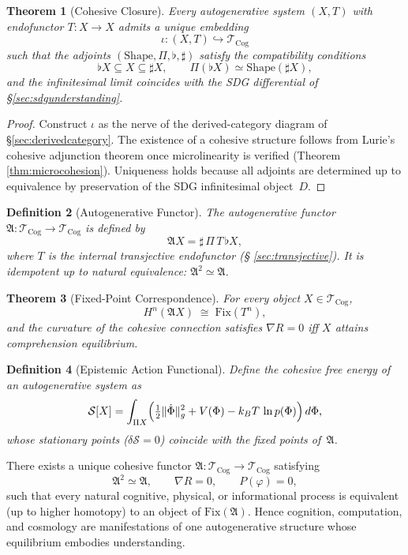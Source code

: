 \documentclass[12pt,a4paper,twoside,openright]{book}
\newtheorem{theorem}{Theorem}
\newtheorem{definition}[theorem]{Definition}
\begin{document}
\begin{theorem}[Cohesive Closure]
\label{thm:cohesiveclosure}
Every autogenerative system $(X,T)$ with endofunctor $T:\!X\!\to\!X$
admits a unique embedding
\[
\iota:(X,T)\hookrightarrow\mathcal{T}_{\mathrm{Cog}}
\]
such that the adjoints $(\mathrm{Shape},\Pi,\flat,\sharp)$
satisfy the compatibility conditions
\[
\flat X\subseteq X\subseteq\sharp X,\qquad
\Pi(\flat X)\simeq \mathrm{Shape}(\sharp X),
\]
and the infinitesimal limit coincides with the SDG differential
of §\ref{sec:sdgunderstanding}.
\end{theorem}

\begin{proof}
Construct $\iota$ as the nerve of the derived-category diagram of §\ref{sec:derivedcategory}.
The existence of a cohesive structure follows from Lurie’s
cohesive adjunction theorem once microlinearity is verified (Theorem \ref{thm:microcohesion}).
Uniqueness holds because all adjoints are determined up to equivalence
by preservation of the SDG infinitesimal object~$D$.
\end{proof}

\begin{definition}[Autogenerative Functor]
The \emph{autogenerative functor}
\(
\mathfrak{A}:\mathcal{T}_{\mathrm{Cog}}\!\to\!\mathcal{T}_{\mathrm{Cog}}
\)
is defined by
\[
\mathfrak{A}X
=
\sharp\,\Pi\,T\,\flat X,
\]
where $T$ is the internal transjective endofunctor (§ \ref{sec:transjective}).
It is idempotent up to natural equivalence:
$\mathfrak{A}^2\simeq\mathfrak{A}$.
\end{definition}

\begin{theorem}[Fixed-Point Correspondence]
For every object $X\in\mathcal{T}_{\mathrm{Cog}}$,
\[
H^n(\mathfrak{A}X)\;\cong\;
\mathrm{Fix}(T^n),
\]
and the curvature of the cohesive connection satisfies
\(
\nabla R = 0
\)
iff $X$ attains comprehension equilibrium.
\end{theorem}

\begin{definition}[Epistemic Action Functional]
Define the cohesive free energy of an autogenerative system as
\[
\mathcal{S}[X]
=\int_{\Pi X}
\Bigl(\tfrac12\|\dot{\Phi}\|_g^2
+V(\Phi)
-k_B T\,\ln p(\Phi)\Bigr)\,d\Phi,
\]
whose stationary points ($\delta\mathcal{S}=0$)
coincide with the fixed points of~$\mathfrak{A}$.
\end{definition}

\begin{conjecture}
\label{conj:grandunified}
There exists a unique cohesive functor
\(
\mathfrak{A}:\mathcal{T}_{\mathrm{Cog}}\!\to\!\mathcal{T}_{\mathrm{Cog}}
\)
satisfying
\[
\mathfrak{A}^2\simeq\mathfrak{A},\qquad
\nabla R = 0,\qquad
P(\varphi)=0,
\]
such that every natural cognitive, physical, or informational process
is equivalent (up to higher homotopy) to an object of
$\mathrm{Fix}(\mathfrak{A})$.
Hence cognition, computation, and cosmology
are manifestations of one autogenerative structure
whose equilibrium embodies understanding.
\end{conjecture}
\end{document}
